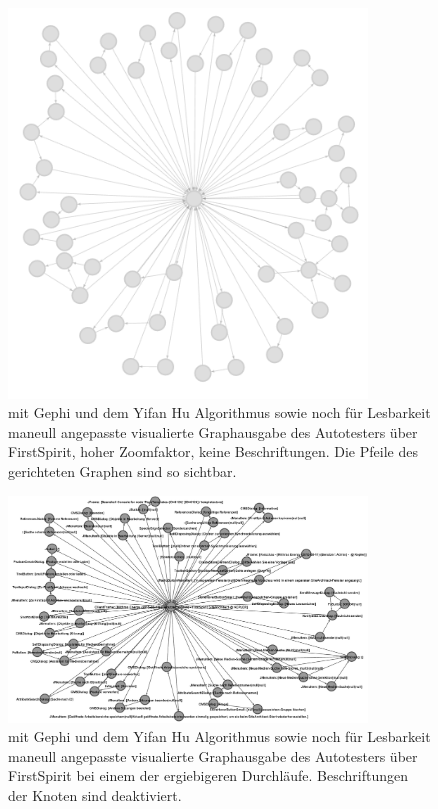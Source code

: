 \begin{figure}
	\centering
	\includegraphics[width=0.85\textwidth]{bilder/model_firstspirit_notext.png}
	\caption{mit Gephi und dem Yifan Hu Algorithmus \cite{hu2005efficient}
    sowie noch für Lesbarkeit maneull angepasste visualierte Graphausgabe 
	des Autotesters über FirstSpirit, hoher Zoomfaktor, keine Beschriftungen.
	Die Pfeile des gerichteten Graphen sind so sichtbar.}
	\label{fig:model_firstspirit_notext}
\end{figure}

\begin{figure}
	\centering
	\includegraphics[width=0.85\textwidth]{bilder/model_freespirit.png}
	\caption{mit Gephi und dem Yifan Hu Algorithmus \cite{hu2005efficient}
    sowie noch für Lesbarkeit maneull angepasste visualierte Graphausgabe 
	des Autotesters über FirstSpirit bei einem der ergiebigeren Durchläufe.
	Beschriftungen der Knoten sind deaktiviert.}
	\label{fig:model_freespirit_06.10.2015}
\end{figure}



